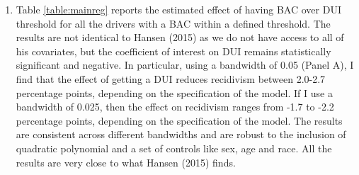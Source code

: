 \documentclass[11pt]{article}\usepackage[]{graphicx}\usepackage[]{color}
\begin{document}
\begin{enumerate}
 \item Table \ref{table:mainreg} reports the estimated effect of having BAC over DUI threshold for all the drivers with a BAC within a defined threshold. The results are not identical to Hansen (2015) as we do not have access to all of his covariates, but the coefficient of interest on DUI remains statistically significant and negative. In particular, using a  bandwidth of 0.05 (Panel A), I find that the effect of getting a DUI reduces recidivism between 2.0-2.7 percentage points, depending on the specification of the model. If I use a bandwidth of 0.025, then the effect on recidivism ranges from -1.7 to -2.2 percentage points, depending on the specification of the model. The results are consistent across different bandwidths and are robust to the inclusion of quadratic polynomial and a set of controls like sex, age and race. All the results are very close to what Hansen (2015) finds.
 


\end{enumerate}
\end{document}
